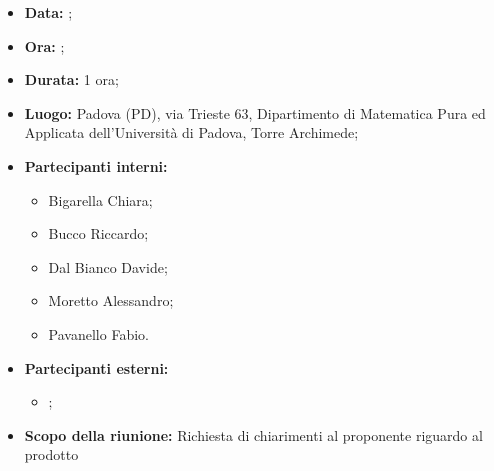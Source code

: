 
\begin{itemize}
	\item \textbf{Data:} ;
	\item \textbf{Ora:} ;
	\item \textbf{Durata:} 1 ora;
	\item \textbf{Luogo:} Padova (PD), via Trieste 63, Dipartimento di Matematica Pura ed Applicata dell’Università di Padova, Torre Archimede;
	\item \textbf{Partecipanti interni:}
	\begin{itemize}
		\item Bigarella Chiara;
		\item Bucco Riccardo;
		\item Dal Bianco Davide;
		\item Moretto Alessandro;
		\item Pavanello Fabio.
	\end{itemize}
	\item \textbf{Partecipanti esterni:}
	\begin{itemize}
		\item \proponente;
	\end{itemize}
	\item \textbf{Scopo della riunione:} Richiesta di chiarimenti al proponente riguardo al prodotto
\end{itemize}
\newpage
